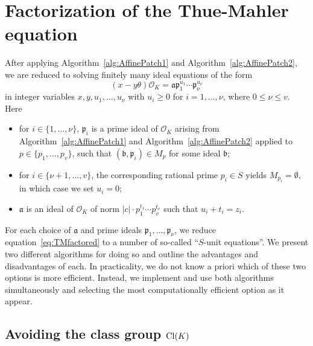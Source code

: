 \section{Factorization of the Thue-Mahler equation}
\label{sec:FactorizationTM}

After applying Algorithm~\ref{alg:AffinePatch1} and Algorithm~\ref{alg:AffinePatch2}, we are reduced to solving finitely many ideal equations of the form
\begin{equation}\label{eq:TMfactored}
(x-y\theta)\mathcal{O}_K=\mathfrak{a} \mathfrak{p}_1^{u_1}\cdots \mathfrak{p}_{\nu}^{u_{\nu}}
\end{equation}
in integer variables $x,y,u_1, \dots, u_{\nu}$ with $u_i \geq 0$ for $i = 1, \dots, \nu$, where ${0 \leq \nu \leq v}$. Here
\begin{itemize}
\item for $i \in \{1, \dots, \nu\}$, $\mathfrak{p}_i$ is a prime ideal of $\mathcal{O}_K$ arising from Algorithm~\ref{alg:AffinePatch1} and Algorithm~\ref{alg:AffinePatch2} applied to $p \in \{p_1, \dots, p_v\}$, such that $(\mathfrak{b}, \mathfrak{p}_i) \in M_p$ for some ideal $\mathfrak{b}$;
\item for $i \in \{\nu+1, \dots, v\}$, the corresponding rational prime $p_i \in S$ yields $M_{p_i} = \emptyset$, in which case we set $u_i = 0$;
\item $\mathfrak{a}$ is an ideal of $\mathcal{O}_K$ of norm $|c|\cdot p_1^{t_1} \cdots p_v^{t_v}$ such that
$u_i + t_i =  z_i$. 
\end{itemize}

For each choice of $\mathfrak{a}$ and prime ideals $\mathfrak{p}_1, \dots, \mathfrak{p}_{\nu}$, we reduce equation~\eqref{eq:TMfactored} to a number of so-called ``$S$-unit equations''. We present two different algorithms for doing so and outline the advantages and disadvantages of each. In practicality, we do not know a priori which of these two options is more efficient. Instead, we implement and use both algorithms simultaneously and selecting the most computationally efficient option as it appear. 


\subsection{Avoiding the class group $\operatorname{Cl}(K)$}
\label{subsec:FactorizationTMwithoutOK}

